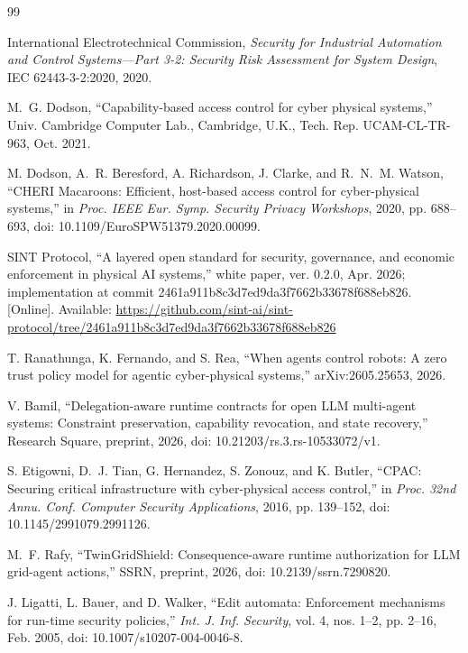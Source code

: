 \begin{thebibliography}{99}

International Electrotechnical Commission, \emph{Security for Industrial Automation and Control Systems---Part 3-2: Security Risk Assessment for System Design}, IEC 62443-3-2:2020, 2020.

M.~G. Dodson, ``Capability-based access control for cyber physical systems,'' Univ. Cambridge Computer Lab., Cambridge, U.K., Tech. Rep. UCAM-CL-TR-963, Oct. 2021.

M. Dodson, A.~R. Beresford, A. Richardson, J. Clarke, and R.~N.~M. Watson, ``CHERI Macaroons: Efficient, host-based access control for cyber-physical systems,'' in \emph{Proc. IEEE Eur. Symp. Security Privacy Workshops}, 2020, pp. 688--693, doi: 10.1109/EuroSPW51379.2020.00099.

SINT Protocol, ``A layered open standard for security, governance, and economic enforcement in physical AI systems,'' white paper, ver. 0.2.0, Apr. 2026; implementation at commit 2461a911b8c3d7ed9da3f7662b33678f688eb826. [Online]. Available: \url{https://github.com/sint-ai/sint-protocol/tree/2461a911b8c3d7ed9da3f7662b33678f688eb826}

T. Ranathunga, K. Fernando, and S. Rea, ``When agents control robots: A zero trust policy model for agentic cyber-physical systems,'' arXiv:2605.25653, 2026.

V. Bamil, ``Delegation-aware runtime contracts for open LLM multi-agent systems: Constraint preservation, capability revocation, and state recovery,'' Research Square, preprint, 2026, doi: 10.21203/rs.3.rs-10533072/v1.

S. Etigowni, D.~J. Tian, G. Hernandez, S. Zonouz, and K. Butler, ``CPAC: Securing critical infrastructure with cyber-physical access control,'' in \emph{Proc. 32nd Annu. Conf. Computer Security Applications}, 2016, pp. 139--152, doi: 10.1145/2991079.2991126.

M.~F. Rafy, ``TwinGridShield: Consequence-aware runtime authorization for LLM grid-agent actions,'' SSRN, preprint, 2026, doi: 10.2139/ssrn.7290820.

J. Ligatti, L. Bauer, and D. Walker, ``Edit automata: Enforcement mechanisms for run-time security policies,'' \emph{Int. J. Inf. Security}, vol. 4, nos. 1--2, pp. 2--16, Feb. 2005, doi: 10.1007/s10207-004-0046-8.


\end{thebibliography}
